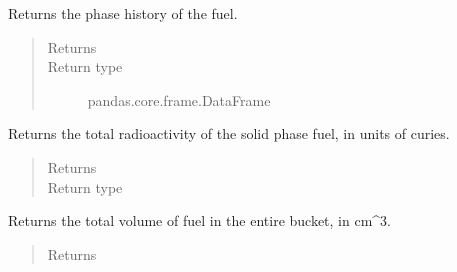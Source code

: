 \documentclass[letterpaper,10pt,openany,oneside,english]{sphinxmanual}
\begin{document}
\begin{fulllineitems}

\begin{fulllineitems}
\label{\detokenize{support_rst/fuel_bucket:fuel_bucket.FuelBucket.get_fuel_phase}}
Returns the phase history of the fuel.
\begin{quote}\begin{description}
\item[{Returns}] \leavevmode
{}

\item[{Return type}] \leavevmode
pandas.core.frame.DataFrame

\end{description}\end{quote}

\end{fulllineitems}


\begin{fulllineitems}
\label{\detokenize{support_rst/fuel_bucket:fuel_bucket.FuelBucket.get_fuel_radioactivity}}
Returns the total radioactivity of the solid phase fuel, in units of
curies.
\begin{quote}\begin{description}
\item[{Returns}] \leavevmode
{}

\item[{Return type}] \leavevmode
{}

\end{description}\end{quote}

\end{fulllineitems}


\begin{fulllineitems}
\label{\detokenize{support_rst/fuel_bucket:fuel_bucket.FuelBucket.get_fuel_volume}}
Returns the total volume of fuel in the entire bucket, in cm\textasciicircum{}3.
\begin{quote}\begin{description}
\item[{Returns}] \leavevmode
{}


\end{description}
\end{quote}
\end{fulllineitems}
\end{fulllineitems}
\end{document}
